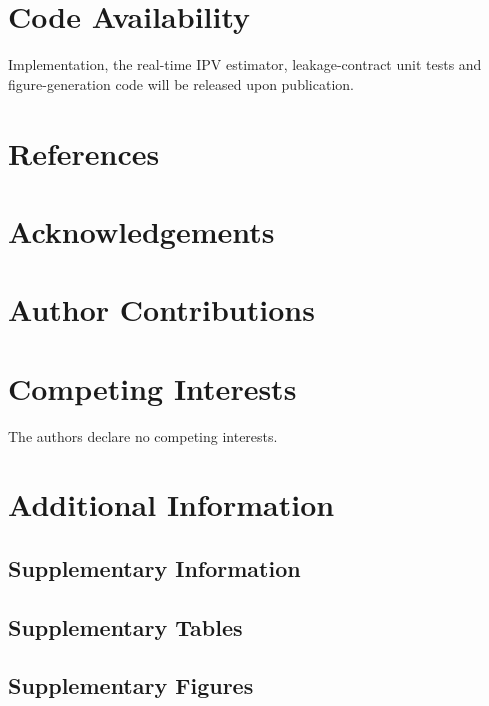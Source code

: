 \documentclass[12pt,a4paper]{article}
\begin{document}
\section*{Code Availability}
Implementation, the real-time IPV estimator, leakage-contract unit tests and
figure-generation code will be released upon publication.

\section*{References}



\section*{Acknowledgements}

\section*{Author Contributions}

\section*{Competing Interests}
The authors declare no competing interests.

\section*{Additional Information}
\subsection*{Supplementary Information}
\subsection*{Supplementary Tables}
\subsection*{Supplementary Figures}
\end{document}
